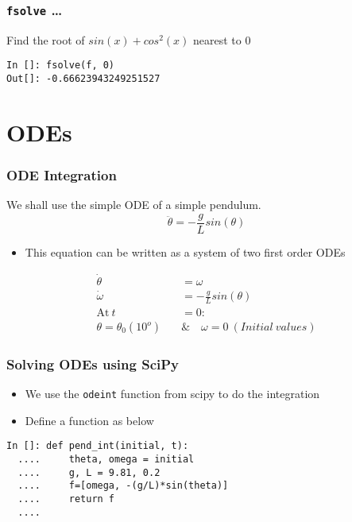 \documentclass[14pt,compress]{beamer}
\newcommand{\typ}[1]{\lstinline{#1}}
\begin{document}
\begin{frame}[fragile]
\frametitle{\typ{fsolve} \ldots}
Find the root of $sin(x)+cos^2(x)$ nearest to $0$
\begin{lstlisting}
In []: fsolve(f, 0)
Out[]: -0.66623943249251527
\end{lstlisting}
\end{frame}




\section{ODEs}
\begin{frame}[fragile]
\frametitle{ODE Integration}
We shall use the simple ODE of a simple pendulum. 
\begin{equation*}
\ddot{\theta} = -\frac{g}{L}sin(\theta)
\end{equation*}
\begin{itemize}
\item This equation can be written as a system of two first order ODEs
\end{itemize}
\begin{align}
\dot{\theta} &= \omega \\
\dot{\omega} &= -\frac{g}{L}sin(\theta) \\
 \text{At}\ t &= 0 : \nonumber \\
 \theta = \theta_0(10^o)\quad & \&\quad  \omega = 0\ (Initial\ values)\nonumber 
\end{align}
\end{frame}

\begin{frame}[fragile]
\frametitle{Solving ODEs using SciPy}
\begin{itemize}
\item We use the \typ{odeint} function from scipy to do the integration
\item Define a function as below
\end{itemize}
\begin{lstlisting}
In []: def pend_int(initial, t):
  ....     theta, omega = initial
  ....     g, L = 9.81, 0.2
  ....     f=[omega, -(g/L)*sin(theta)]
  ....     return f
  ....
\end{lstlisting}
\end{frame}
\end{document}
